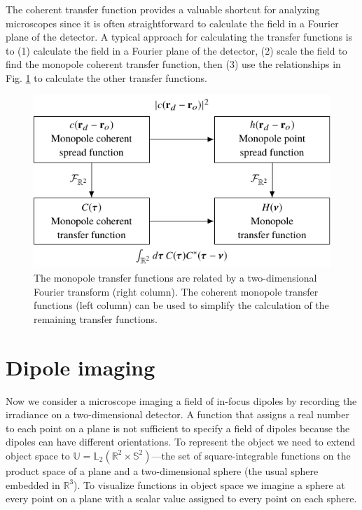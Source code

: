 \documentclass[]{osa-article}
\providecommand{\mbb}[1]{\mathbb{#1}}
\begin{document}
The coherent transfer function provides a valuable shortcut for analyzing
microscopes since it is often straightforward to calculate the field in a
Fourier plane of the detector. A typical approach for calculating the transfer
functions is to (1) calculate the field in a Fourier plane of the detector, (2)
scale the field to find the monopole coherent transfer function, then (3) use
the relationships in Fig. \ref{fig:monopole-transfer-functions} to calculate
the other transfer functions.

\begin{figure}
  \centering
  \includegraphics[scale=1.0]{../figures/monopole-transfer-functions/monopole-transfer-functions.pdf}
  \caption{The monopole transfer functions are related by a
    two-dimensional Fourier transform (right column). The coherent monopole
    transfer functions (left column) can be used to simplify the calculation of
    the remaining transfer functions.}
   \label{fig:monopole-transfer-functions}
 \end{figure}

\section{Dipole imaging}\label{sec:dipole}
Now we consider a microscope imaging a field of in-focus dipoles by recording
the irradiance on a two-dimensional detector. A function that assigns a real
number to each point on a plane is not sufficient to specify a field of dipoles
because the dipoles can have different orientations. To represent the object we
need to extend object space to
$\mbb{U} = \mbb{L}_2(\mbb{R}^2\times\mbb{S}^2)$---the set of square-integrable
functions on the product space of a plane and a two-dimensional sphere (the
usual sphere embedded in $\mbb{R}^3$). To visualize functions in object space we
imagine a sphere at every point on a plane with a scalar value assigned to every
point on each sphere.
\end{document}

